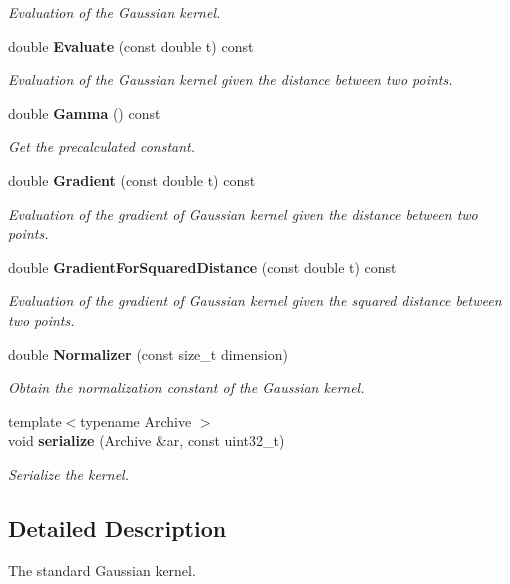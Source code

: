 \begin{DoxyCompactItemize}
\begin{DoxyCompactList}\small\item\em Evaluation of the Gaussian kernel. \end{DoxyCompactList}\item 
double \textbf{ Evaluate} (const double t) const
\begin{DoxyCompactList}\small\item\em Evaluation of the Gaussian kernel given the distance between two points. \end{DoxyCompactList}\item 
double \textbf{ Gamma} () const
\begin{DoxyCompactList}\small\item\em Get the precalculated constant. \end{DoxyCompactList}\item 
double \textbf{ Gradient} (const double t) const
\begin{DoxyCompactList}\small\item\em Evaluation of the gradient of Gaussian kernel given the distance between two points. \end{DoxyCompactList}\item 
double \textbf{ Gradient\+For\+Squared\+Distance} (const double t) const
\begin{DoxyCompactList}\small\item\em Evaluation of the gradient of Gaussian kernel given the squared distance between two points. \end{DoxyCompactList}\item 
double \textbf{ Normalizer} (const size\+\_\+t dimension)
\begin{DoxyCompactList}\small\item\em Obtain the normalization constant of the Gaussian kernel. \end{DoxyCompactList}\item 
{\footnotesize template$<$typename Archive $>$ }\\void \textbf{ serialize} (Archive \&ar, const uint32\+\_\+t)
\begin{DoxyCompactList}\small\item\em Serialize the kernel. \end{DoxyCompactList}\end{DoxyCompactItemize}


\subsection{Detailed Description}
The standard Gaussian kernel. 

